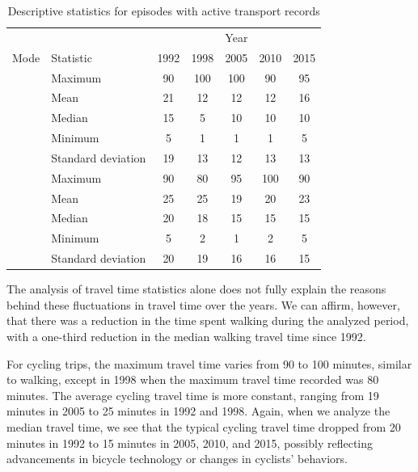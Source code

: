 \documentclass[preprint, 3p,
authoryear]{elsarticle} %
\begin{document}
\begingroup\fontsize{10}{12}\selectfont

\begin{longtable}[t]{>{}llccccc}
\caption{\label{tab:table-02}\label{tab:table-02}Descriptive statistics for episodes with active transport records}\\
\toprule
\multicolumn{2}{c}{ } & \multicolumn{5}{c}{Year} \\
\cmidrule(l{3pt}r{3pt}){3-7}
Mode & Statistic & 1992 & 1998 & 2005 & 2010 & 2015\\
\midrule
 & Maximum & 90 & 100 & 100 & 90 & 95\\
\nopagebreak
 & Mean & 21 & 12 & 12 & 12 & 16\\
\nopagebreak
 & Median & 15 & 5 & 10 & 10 & 10\\
\nopagebreak
 & Minimum & 5 & 1 & 1 & 1 & 5\\
\nopagebreak
\multirow[t]{-5}{*}{\raggedright\arraybackslash \textbf{Walking}} & Standard deviation & 19 & 13 & 12 & 13 & 13\\
\cmidrule{1-7}\pagebreak[0]
 & Maximum & 90 & 80 & 95 & 100 & 90\\
\nopagebreak
 & Mean & 25 & 25 & 19 & 20 & 23\\
\nopagebreak
 & Median & 20 & 18 & 15 & 15 & 15\\
\nopagebreak
 & Minimum & 5 & 2 & 1 & 2 & 5\\
\nopagebreak
\multirow[t]{-5}{*}{\raggedright\arraybackslash \textbf{Cycling}} & Standard deviation & 20 & 19 & 16 & 16 & 15\\
\bottomrule
\end{longtable}
\endgroup{}

The analysis of travel time statistics alone does not fully explain the
reasons behind these fluctuations in travel time over the years. We can
affirm, however, that there was a reduction in the time spent walking
during the analyzed period, with a one-third reduction in the median
walking travel time since 1992.

For cycling trips, the maximum travel time varies from 90 to 100
minutes, similar to walking, except in 1998 when the maximum travel time
recorded was 80 minutes. The average cycling travel time is more
constant, ranging from 19 minutes in 2005 to 25 minutes in 1992 and
1998. Again, when we analyze the median travel time, we see that the
typical cycling travel time dropped from 20 minutes in 1992 to 15
minutes in 2005, 2010, and 2015, possibly reflecting advancements in
bicycle technology or changes in cyclists' behaviors.
\end{document}
